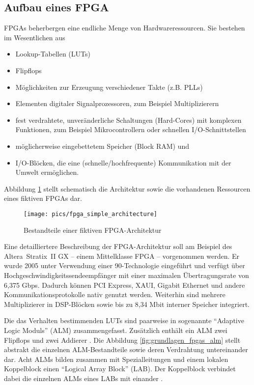 \subsection{Aufbau eines FPGA}
FPGAs beherbergen eine endliche Menge von Hardwareressourcen. Sie
bestehen im Wesentlichen aus
\begin{itemize}
\item Lookup-Tabellen (LUTs)
\item Flipflops
\item Möglichkeiten zur Erzeugung verschiedener Takte (z.B. PLLs)
\item Elementen digitaler Signalprozessoren, zum Beispiel
  Multiplizierern
\item fest verdrahtete, unveränderliche Schaltungen (Hard-Cores) mit
  komplexen Funktionen, zum Beispiel Mikrocontrollern oder schnellen
  I/O-Schnittstellen
\item möglicherweise eingebettetem Speicher (Block RAM) und
\item I/O-Blöcken, die eine (schnelle/hochfrequente) Kommunikation mit
  der Umwelt ermöglichen.
\end{itemize}

Abbildung \ref{fig:grundlagen_fpgas_aufbauallgemein} stellt
schematisch die Architektur sowie die vorhandenen Ressourcen eines
fiktiven FPGAs dar.

\begin{figure}[htbp]
	\centering
	\texttt{[image: pics/fpga\_simple\_architecture]}
	\caption{Bestandteile einer fiktiven FPGA-Architektur}
	\label{fig:grundlagen_fpgas_aufbauallgemein}
\end{figure}

Eine detailliertere Beschreibung der FPGA-Architektur soll am Beispiel
des Al\-te\-ra\TReg\ Stra\-tix\TReg\ II GX -- einem Mittelklasse FPGA --
vorgenommen werden. Er wurde 2005 unter Verwendung einer
\unit{90}{\nano\meter}-Technologie eingeführt und verfügt über
Hochgeschwindigkeitssendeempfänger mit einer maximalen
Übertragungsrate von 6,375 Gbps. Dadurch
können PCI Express, XAUI, Gigabit Ethernet und andere
Kommunikationsprotokolle nativ genutzt werden. Weiterhin sind mehrere
Multiplizierer in DSP-Blöcken sowie bis zu 8,34 Mbit
interner Speicher integriert. 

Die das Verhalten bestimmenden LUTs sind paarweise in sogenannte
``Adaptive Logic Moduls'' (ALM) zusammengefasst. Zusätzlich enthält
ein ALM zwei Flipflops und zwei Addierer \cite[S. 2-6 ff.]{stratixhandbook09}. Die Abbildung
\ref{fig:grundlagen_fpgas_alm} stellt abstrakt die einzelnen
ALM-Bestandteile sowie deren Verdrahtung untereinander dar. Acht ALMs
bilden zusammen mit Spezialleitungen und einem lokalen Koppelblock
einen ``Logical Array Block'' (LAB). Der Koppelblock verbindet dabei
die einzelnen ALMs eines LABs mit einander \cite[S. 2-3
ff.]{stratixhandbook09}. 

